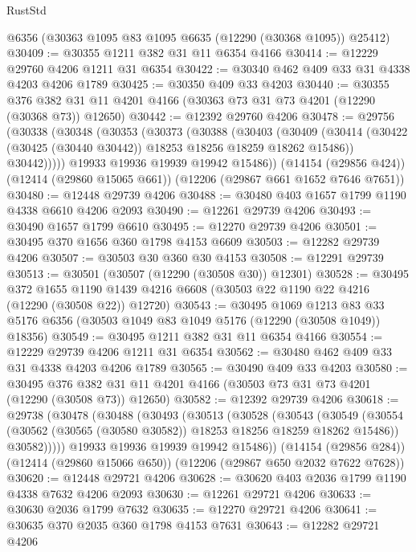 \begin{lexlean}{RustStd}
\begin{coremodule}
    @6356
    (@30363 @1095 @83 @1095 @6635 (@12290 (@30368 @1095)) @25412)
@30409 := @30355 @1211 @382 @31 @11 @6354 @4166
@30414 := @12229 @29760 @4206 @1211 @31 @6354
@30422 := @30340 @462 @409 @33 @31 @4338 @4203 @4206 @1789
@30425 := @30350 @409 @33 @4203
@30440 := @30355
    @376
    @382
    @31
    @11
    @4201
    @4166
    (@30363 @73 @31 @73 @4201 (@12290 (@30368 @73)) @12650)
@30442 := @12392 @29760 @4206
@30478 := @29756
    (@30338
      (@30348
        (@30353
          (@30373
            (@30388
              (@30403
                (@30409
                  (@30414 (@30422 (@30425 (@30440 @30442)) @18253 @18256 @18259 @18262 @15486))
                  @30442)))))
        @19933
        @19936
        @19939
        @19942
        @15486))
    (@14154 (@29856 @424))
    (@12414 (@29860 @15065 @661))
    (@12206 (@29867 @661 @1652 @7646 @7651))
@30480 := @12448 @29739 @4206
@30488 := @30480 @403 @1657 @1799 @1190 @4338 @6610 @4206 @2093
@30490 := @12261 @29739 @4206
@30493 := @30490 @1657 @1799 @6610
@30495 := @12270 @29739 @4206
@30501 := @30495 @370 @1656 @360 @1798 @4153 @6609
@30503 := @12282 @29739 @4206
@30507 := @30503 @30 @360 @30 @4153
@30508 := @12291 @29739
@30513 := @30501 (@30507 (@12290 (@30508 @30)) @12301)
@30528 := @30495
    @372
    @1655
    @1190
    @1439
    @4216
    @6608
    (@30503 @22 @1190 @22 @4216 (@12290 (@30508 @22)) @12720)
@30543 := @30495
    @1069
    @1213
    @83
    @33
    @5176
    @6356
    (@30503 @1049 @83 @1049 @5176 (@12290 (@30508 @1049)) @18356)
@30549 := @30495 @1211 @382 @31 @11 @6354 @4166
@30554 := @12229 @29739 @4206 @1211 @31 @6354
@30562 := @30480 @462 @409 @33 @31 @4338 @4203 @4206 @1789
@30565 := @30490 @409 @33 @4203
@30580 := @30495
    @376
    @382
    @31
    @11
    @4201
    @4166
    (@30503 @73 @31 @73 @4201 (@12290 (@30508 @73)) @12650)
@30582 := @12392 @29739 @4206
@30618 := @29738
    (@30478
      (@30488
        (@30493
          (@30513
            (@30528
              (@30543
                (@30549
                  (@30554 (@30562 (@30565 (@30580 @30582)) @18253 @18256 @18259 @18262 @15486))
                  @30582)))))
        @19933
        @19936
        @19939
        @19942
        @15486))
    (@14154 (@29856 @284))
    (@12414 (@29860 @15066 @650))
    (@12206 (@29867 @650 @2032 @7622 @7628))
@30620 := @12448 @29721 @4206
@30628 := @30620 @403 @2036 @1799 @1190 @4338 @7632 @4206 @2093
@30630 := @12261 @29721 @4206
@30633 := @30630 @2036 @1799 @7632
@30635 := @12270 @29721 @4206
@30641 := @30635 @370 @2035 @360 @1798 @4153 @7631
@30643 := @12282 @29721 @4206

\end{coremodule}
\end{lexlean}
